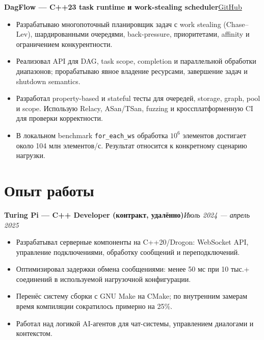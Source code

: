 \documentclass[a4paper,10pt]{article}
\newcommand{\project}[3]{%
    \noindent\textbf{#1}\hfill\href{#2}{#3}\par
}
\newcommand{\experience}[2]{%
    \noindent\textbf{#1}\hfill\textit{#2}\par
}
\begin{document}
\project
    {DagFlow --- C++23 task runtime и work-stealing scheduler}
    {https://github.com/cpp20120/DagFlow}
    {GitHub}

\begin{itemize}
    \item Разрабатываю многопоточный планировщик задач
    с work stealing (Chase--Lev), шардированными очередями,
    back-pressure, приоритетами, affinity
    и ограничением конкурентности.

    \item Реализовал API для DAG, task scope,
    completion и параллельной обработки диапазонов;
    прорабатываю явное владение ресурсами,
    завершение задач и shutdown semantics.

    \item Разработал property-based и stateful тесты
    для очередей, storage, graph, pool и scope.
    Использую Relacy, ASan/TSan, fuzzing
    и кроссплатформенную CI для проверки корректности.

    \item В локальном benchmark \texttt{for\_each\_ws}
    обработка $10^6$ элементов достигает
    около 104 млн элементов/с.
    Результат относится к конкретному сценарию нагрузки.
\end{itemize}

\section*{Опыт работы}

\experience
    {Turing Pi --- C++ Developer (контракт, удалённо)}
    {Июль 2024 --- апрель 2025}

\begin{itemize}
    \item Разрабатывал серверные компоненты на C++20/Drogon:
    WebSocket API, управление подключениями,
    обработку сообщений и переподключений.

    \item Оптимизировал задержки обмена сообщениями:
    менее 50 мс при 10 тыс.+ соединений
    в используемой нагрузочной конфигурации.

    \item Перенёс систему сборки с GNU Make на CMake;
    по внутренним замерам время компиляции
    сократилось примерно на 25\%.

    \item Работал над логикой AI-агентов для чат-системы,
    управлением диалогами и контекстом.
\end{itemize}
\end{document}
